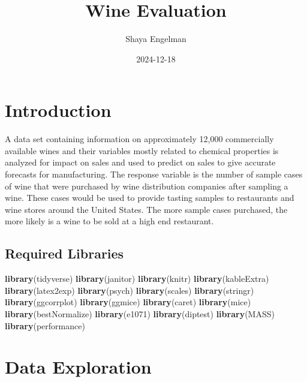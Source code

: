\documentclass[
]{article}
\title{Wine Evaluation}
\author{Shaya Engelman}
\date{2024-12-18}
\newenvironment{Shaded}{\begin{snugshade}}{\end{snugshade}}
\newcommand{\FunctionTok}[1]{\textcolor[rgb]{0.13,0.29,0.53}{\textbf{#1}}}
\newcommand{\NormalTok}[1]{#1}
\begin{document}
\maketitle

\section{Introduction}\label{introduction}

A data set containing information on approximately 12,000 commercially
available wines and their variables mostly related to chemical
properties is analyzed for impact on sales and used to predict on sales
to give accurate forecasts for manufacturing. The response variable is
the number of sample cases of wine that were purchased by wine
distribution companies after sampling a wine. These cases would be used
to provide tasting samples to restaurants and wine stores around the
United States. The more sample cases purchased, the more likely is a
wine to be sold at a high end restaurant.

\subsection{Required Libraries}\label{required-libraries}

\begin{Shaded}
\begin{Highlighting}[]
\FunctionTok{library}\NormalTok{(tidyverse)}
\FunctionTok{library}\NormalTok{(janitor)}
\FunctionTok{library}\NormalTok{(knitr)}
\FunctionTok{library}\NormalTok{(kableExtra)}
\FunctionTok{library}\NormalTok{(latex2exp)}
\FunctionTok{library}\NormalTok{(psych)}
\FunctionTok{library}\NormalTok{(scales)}
\FunctionTok{library}\NormalTok{(stringr)}
\FunctionTok{library}\NormalTok{(ggcorrplot)}
\FunctionTok{library}\NormalTok{(ggmice)}
\FunctionTok{library}\NormalTok{(caret)}
\FunctionTok{library}\NormalTok{(mice)}
\FunctionTok{library}\NormalTok{(bestNormalize)}
\FunctionTok{library}\NormalTok{(e1071)}
\FunctionTok{library}\NormalTok{(diptest)}
\FunctionTok{library}\NormalTok{(MASS)}
\FunctionTok{library}\NormalTok{(performance)}
\end{Highlighting}
\end{Shaded}

\section{Data Exploration}\label{data-exploration}
\end{document}
